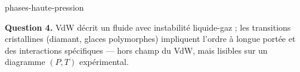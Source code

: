 \begin{exo}{phases-haute-pression}
\begin{solution}
\textbf{Question 4.} VdW décrit un fluide avec instabilité liquide-gaz ; les transitions cristallines (diamant, glaces polymorphes) impliquent l'ordre à longue portée et des interactions spécifiques — hors champ du VdW, mais lisibles sur un diagramme $(P,T)$ expérimental.
\end{solution}
\end{exo}
